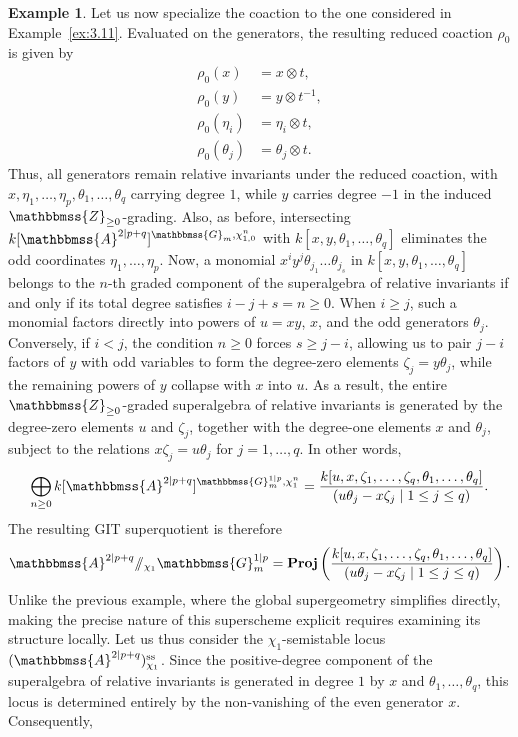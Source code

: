 \documentclass[11pt,a4paper,reqno,noamsfonts]{amsart}
\numberwithin{equation}{section}
\theoremstyle{definition}
\newtheorem{example}[theorem]{Example}
\theoremstyle{remark}
\renewcommand{\AA}{\ensuremath{\mathbbmss{A}}}
\newcommand{\GG}{\ensuremath{\mathbbmss{G}}}
\newcommand{\ZZ}{\ensuremath{\mathbbmss{Z}}}
\newcommand{\uss}{\ensuremath{\mathrm{ss}}}
\DeclareMathOperator{\sProj}{\mathbf{Proj}}
\begin{document}
\begin{example}
Let us now specialize the coaction to the one considered in Example~\ref{ex:3.11}. Evaluated on the generators, the resulting reduced coaction $\rho_0$ is given by
$$
\begin{aligned} 
 \rho_0 (x) &= x \otimes t, \\ 
 \rho_0 (y) &= y \otimes t^{-1}, \\  
 \rho_0 (\eta_i) &= \eta_i \otimes t, \\ 
 \rho_0 (\theta_j) &= \theta_j \otimes t. 
 \end{aligned}
$$
Thus, all generators remain relative invariants under the reduced coaction, with $x, \eta_1,\dots,\eta_p, \theta_1,\dots,\theta_q$ carrying degree $1$, while $y$ carries degree $-1$ in the induced $\ZZ_{\geq 0}$-grading. Also, as before, intersecting $k[\AA^{2 \vert p+q}]^{\GG_m, \chi_{1,0}^n}$ with $k[x,y,\theta_1,\dots,\theta_q]$ eliminates the odd coordinates $\eta_1,\dots,\eta_p$. Now, a monomial $x^i y^j \theta_{j_1} \dots \theta_{j_s}$ in $k[x,y,\theta_1,\dots,\theta_q]$ belongs to the $n$-th graded component of the superalgebra of relative invariants if and only if its total degree satisfies $i - j + s = n \geq 0$. When $i \geq j$, such a monomial factors directly into powers of $u = xy$, $x$, and the odd generators $\theta_j$. Conversely, if $i < j$, the condition $n \ge 0$ forces $s \geq j - i$, allowing us to pair $j - i$ factors of $y$ with odd variables to form the degree-zero elements $\zeta_j = y \theta_j$, while the remaining powers of $y$ collapse with $x$ into $u$. As a result, the entire $\ZZ_{\geq 0}$-graded superalgebra of relative invariants is generated by the degree-zero elements $u$ and $\zeta_j$, together with the degree-one elements $x$ and $\theta_j$, subject to the relations $x \zeta_j = u \theta_j$ for $j = 1, \dots, q$. In other words,
$$
\bigoplus_{n \geq 0} k[\AA^{2 \vert p+q}]^{\GG_m^{1 \vert p}, \chi_{1}^n} = \frac{k[u, x, \zeta_1,\dots,\zeta_q, \theta_1,\dots,\theta_q]}{(u \theta_j - x \zeta_j \mid 1 \le j \le q)}.
$$
The resulting GIT superquotient is therefore
$$
\AA^{2 \vert p+q} {\sslash_{\chi_1}} \GG_m^{1 \vert p} = \sProj \left(  \frac{k[u, x, \zeta_1,\dots,\zeta_q, \theta_1,\dots,\theta_q]}{(u \theta_j - x \zeta_j \mid 1 \le j \le q)} \right).
$$
Unlike the previous example, where the global supergeometry simplifies directly, making the precise nature of this superscheme explicit requires examining its structure locally. Let us thus consider the $\chi_1$-semistable locus $(\AA^{2 \vert p+q})^{\uss}_{\chi_1}$. Since the positive-degree component of the superalgebra of relative invariants is generated in degree $1$ by $x$ and $\theta_1, \dots, \theta_q$, this locus is determined entirely by the non-vanishing of the even generator $x$. Consequently,

\end{example}
\end{document}
